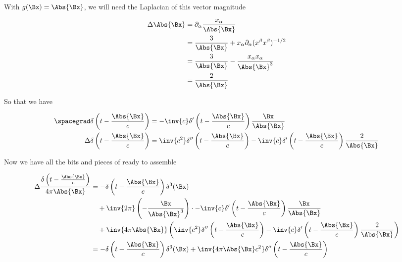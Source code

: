 With \(g(\Bx) = \Abs{\Bx}\), we will need the Laplacian of this vector magnitude

\begin{equation}\label{eqn:relativisticElectrodynamicsL18:900}
\begin{aligned}
\Delta \Abs{\Bx}
&=
\partial_\alpha \frac{x_\alpha}{\Abs{\Bx}} \\
&=
\frac{3}{\Abs{\Bx}} 
+ x_\alpha \partial_\alpha (x^\beta x^\beta)^{-1/2} \\
&=
\frac{3}{\Abs{\Bx}} 
- \frac{x_\alpha x_\alpha}{\Abs{\Bx}^3} \\
&= \frac{2}{\Abs{\Bx}} 
\end{aligned}
\end{equation}

So that we have

\begin{equation}\label{eqn:relativisticElectrodynamicsL18:440}
\begin{aligned}
\spacegrad \delta\left(t - \frac{\Abs{\Bx}}{c}\right) &= 
-\inv{c} \delta'\left(t - \frac{\Abs{\Bx}}{c}\right) \frac{\Bx}{\Abs{\Bx}} \\
\Delta \delta\left(t - \frac{\Abs{\Bx}}{c}\right) &=
\inv{c^2} \delta''\left(t - \frac{\Abs{\Bx}}{c}\right) -\inv{c} \delta'\left(t - \frac{\Abs{\Bx}}{c}\right) \frac{2}{\Abs{\Bx}} 
\end{aligned}
\end{equation}

Now we have all the bits and pieces of  ready to assemble

\begin{equation}\label{eqn:relativisticElectrodynamicsL18:920}
\begin{aligned}
\Delta \frac{\delta\left(t - \frac{\Abs{\Bx}}{c}\right)}{4 \pi \Abs{\Bx} }
&=
-\delta\left(t - \frac{\Abs{\Bx}}{c}\right) \delta^3(\Bx) \\
&\quad +\inv{2\pi} \left( - \frac{\Bx}{\Abs{\Bx}^3} \right)
\cdot
-\inv{c} \delta'\left(t - \frac{\Abs{\Bx}}{c}\right) \frac{\Bx}{\Abs{\Bx}} \\
&\quad +
\inv{4 \pi \Abs{\Bx} }
\left(
\inv{c^2} \delta''\left(t - \frac{\Abs{\Bx}}{c}\right) -\inv{c} \delta'\left(t - \frac{\Abs{\Bx}}{c}\right) \frac{2}{\Abs{\Bx}} \right) \\
&=
-\delta\left(t - \frac{\Abs{\Bx}}{c}\right) \delta^3(\Bx) 
+\inv{4 \pi \Abs{\Bx} c^2 }
\delta''\left(t - \frac{\Abs{\Bx}}{c}\right) 
\end{aligned}
\end{equation}


